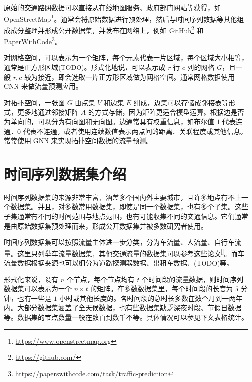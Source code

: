 \documentclass{ctexart}
\renewcommand{\cite}[1]{\textsuperscript{[\citenum{#1}]}}
\begin{document}
原始的交通路网数据可以直接从在线地图服务、政府部门网站等获得，如 OpenStreetMap\footnote{\url{https://www.openstreetmap.org}}。通常会将原始数据进行预处理，然后与时间序列数据等其他组成成分整理并形成公开数据集，并发布在网络上，例如 GitHub\footnote{\url{https://github.com/}} 和 PaperWithCode\footnote{\url{https://paperswithcode.com/task/traffic-prediction}}。

对网格空间，可以表示为一个矩阵，每个元素代表一片区域，每个区域大小相等，通常是正方形区域(TODO)。形式化地说，可以表示成 $r$ 行 $c$ 列的网格 $G$，且一般 $r,c$ 较为接近，即会选取一片正方形区域做为网格空间。通常网格数据使用 CNN 来做流量预测应用。

对拓扑空间，一张图 $G$ 由点集 $V$ 和边集 $E$ 组成，边集可以存储成邻接表等形式，更多地通过邻接矩阵 $A$ 的方式存储，因为矩阵更适合模型运算。根据边是否为单向的，可以分为有向图和无向图。边通常具有权重信息，如布尔值 $1$ 代表连通、$0$ 代表不连通，或者使用连续数值表示两点间的距离、关联程度或其他信息。常常使用 GNN 来实现拓扑空间数据的流量预测。%

\section{时间序列数据集介绍}
时间序列数据集的来源非常丰富，涵盖多个国内外主要城市，且许多地点有不止一个数据集。并且，对多数常用数据集，即使是同一个数据集，也有多个子集。这些子集通常有不同的时间范围与地点范围，也有可能收集不同的交通信息。它们通常是由原始数据集预处理而来，形成公开数据集并被多数研究者使用。

时间序列数据集可以按照流量主体进一步分类，分为车流量、人流量、自行车流量。这里只列举车流量数据集，其他交通流量的数据集可以参考这些论文\cite{tedjopurnomo_survey_2022, jiang_graph_2022, jiang_graph_2023}。而车流量数据根据来源也可以细分为道路探测器数据、出租车数据、(TODO)等。

形式化来说，设有 $n$ 个节点，每个节点均有 $t$ 个时间段的流量数据，则时间序列数据集可以表示为一个 $n \times t$ 的矩阵。在多数数据集里，每个时间段的长度为 $5$ 分钟，也有一些是 $1$ 小时或其他长度的。各时间段的总时长多数在数个月到一两年内。大部分数据集涵盖了全天候数据，也有些数据集缺乏深夜时段、节假日数据等。数据集的节点数量一般在数百到数千不等。具体情况可以参见下文表格统计。
\end{document}
